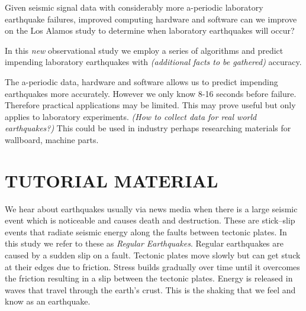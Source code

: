 \documentclass[]{llncs}
\begin{document}
Given seismic signal data with considerably more a-periodic laboratory earthquake failures, improved computing hardware and software can we improve on the Los Alamos study\cite{Bertrand} to determine when laboratory earthquakes will occur?\par

In this {\em new} observational study we employ a series of algorithms and predict impending laboratory earthquakes with {\em (additional facts to be gathered)} accuracy.

The a-periodic data, hardware and software allows us to predict impending earthquakes more accurately. However we only know 8-16 seconds before failure. Therefore practical applications may be limited. This may prove useful but only applies to laboratory experiments. {\em (How to collect data for real world earthquakes?)}  This could be used in industry perhaps researching materials for wallboard, machine parts.\par

\section{TUTORIAL MATERIAL}
We hear about earthquakes usually via news media when there is a large seismic event which is noticeable and causes death and destruction. These are stick–slip events that radiate seismic energy along the faults between tectonic plates. In this study we refer to these as {\em Regular Earthquakes}. Regular earthquakes are caused by a sudden slip on a fault. Tectonic plates move slowly but can get stuck at their edges due to friction. Stress builds gradually over time until it overcomes the friction resulting in a slip between the tectonic plates. Energy is released in waves that travel through the earth's crust. This is the shaking that we feel and know as an earthquake\cite{USGSfaqs}.\par
\end{document}
